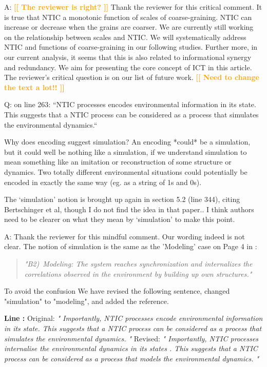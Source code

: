 \documentclass[utf8]{article}
\newcounter{cQuestion}[section]
\newenvironment{question}
    {\refstepcounter{cQuestion}\color{Blue}\noindent\newline Q\thecQuestion:}
    {~\newline}
\newenvironment{ans}  
    {\color{Black}\noindent A:}
    {~\newline}
\newcommand{\revise}[3]{
	\newline
	\newline
    \noindent
    \textbf{Line #1:}
    \newline
    Original:\newline
    \textit{"#2"}
    \newline
    \newline
    Revised:\newline
    \textit{"#3"}\newline}
\newcommand{\toWrite}[1]{\noindent
	\textcolor{Orange}{\textbf{[[ #1 ]]}}}
\begin{document}
    	\begin{ans}
    		\toWrite{The reviewer is right?}
    		Thank the reviewer for this critical comment. It is true that NTIC a monotonic function of scales of coarse-graining. NTIC can increase or decrease when the grains are coarser. We are currently still working on the relationship between scales and NTIC. 
    		We will systematically address NTIC and functions of coarse-graining in our following studies. 
    		Further more, in our current analysis, it seems that this is also related to informational synergy and redundancy. We aim for presenting the core concept of ICT in this article.
    		The reviewer's critical question is on our list of future work. 
    		\toWrite{Need to change the text a lot!!}
    	\end{ans}
    
    
    	\begin{question}
    		on line 263: “NTIC processes encodes environmental information in its state. This suggests that a NTIC process can be considered as a process that simulates the environmental dynamics.“
    		
    		Why does encoding suggest simulation? An encoding *could* be a simulation, but it could well be nothing like a simulation, if we understand simulation to mean something like an imitation or reconstruction of some structure or dynamics. Two totally different environmental situations could potentially be encoded in exactly the same way (eg. as a string of 1s and 0s).
    		
    		The ‘simulation’ notion is brought up again in section 5.2 (line 344), citing Bertschinger et al, though I do not find the idea in that paper.. I think authors need to be clearer on what they mean by ‘simulation’ to make this point.
    	\end{question}
    
    	\begin{ans}
    		Thank the reviewer for this mindful comment. 
    		Our wording indeed is not clear. The notion of simulation is the same as the 'Modeling' case on Page 4 in \cite{BERTSCHINGER.2006}: 
    		\begin{quote}
		    	\textit{"B2)~Modeling: The system reaches synchronization and internalizes the correlations observed in the environment by building up own structures."}    	
    		\end{quote}    	
    	
    		To avoid the confusion We have revised the following sentence, changed "simulation" to "modeling", and added the reference.
    		\revise{}
    		{
    			Importantly, NTIC processes encode environmental information in its state. This suggests that a NTIC process can be considered as a process that simulates the environmental dynamics. }
    		{
    			Importantly, NTIC processes internalise the environmental dynamics in its states \citep[also see P.~4][]{BERTSCHINGER.2006}. This suggests that a NTIC process can be considered as a process that models the environmental dynamics.
    		}
    	\end{ans}
    
\end{document}
